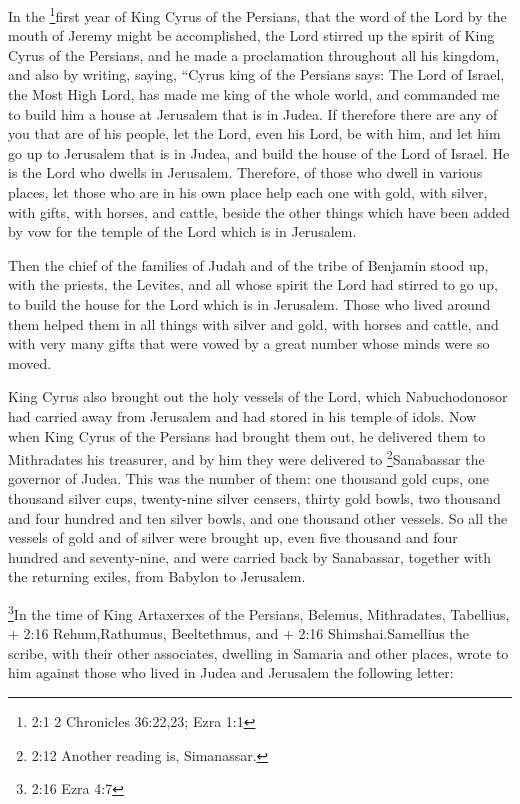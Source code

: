  In the \footnote{2:1 2 Chronicles 36:22,23; Ezra 1:1}first
year of King Cyrus of the Persians, that the word of the Lord by the
mouth of Jeremy might be accomplished,  the Lord stirred up
the spirit of King Cyrus of the Persians, and he made a proclamation
throughout all his kingdom, and also by writing,  saying,
``Cyrus king of the Persians says: The Lord of Israel, the Most High
Lord, has made me king of the whole world,  and commanded me
to build him a house at Jerusalem that is in Judea.  If
therefore there are any of you that are of his people, let the Lord,
even his Lord, be with him, and let him go up to Jerusalem that is in
Judea, and build the house of the Lord of Israel. He is the Lord who
dwells in Jerusalem.  Therefore, of those who dwell in
various places, let those who are in his own place help each one with
gold, with silver,  with gifts, with horses, and cattle,
beside the other things which have been added by vow for the temple of
the Lord which is in Jerusalem.

 Then the chief of the families of Judah and of the tribe of
Benjamin stood up, with the priests, the Levites, and all whose spirit
the Lord had stirred to go up, to build the house for the Lord which is
in Jerusalem.  Those who lived around them helped them in
all things with silver and gold, with horses and cattle, and with very
many gifts that were vowed by a great number whose minds were so moved.

 King Cyrus also brought out the holy vessels of the Lord,
which Nabuchodonosor had carried away from Jerusalem and had stored in
his temple of idols.  Now when King Cyrus of the Persians
had brought them out, he delivered them to Mithradates his treasurer,
 and by him they were delivered to \footnote{2:12 Another
  reading is, Simanassar.}Sanabassar the governor of Judea.
 This was the number of them: one thousand gold cups, one
thousand silver cups, twenty-nine silver censers, thirty gold bowls, two
thousand and four hundred and ten silver bowls, and one thousand other
vessels.  So all the vessels of gold and of silver were
brought up, even five thousand and four hundred and seventy-nine,
 and were carried back by Sanabassar, together with the
returning exiles, from Babylon to Jerusalem.

 \footnote{2:16 Ezra 4:7}In the time of King Artaxerxes of
the Persians, Belemus, Mithradates, Tabellius, + 2:16 Rehum,Rathumus,
Beeltethmus, and + 2:16 Shimshai.Samellius the scribe, with their other
associates, dwelling in Samaria and other places, wrote to him against
those who lived in Judea and Jerusalem the following letter:


